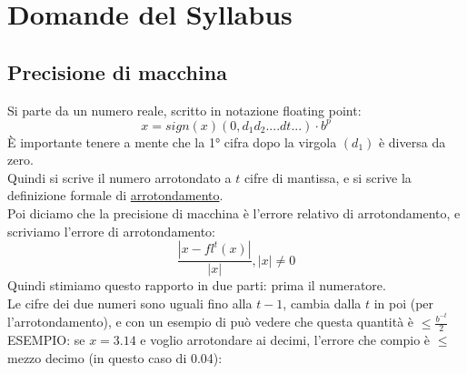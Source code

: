 \section{Domande del Syllabus}

\subsection{Precisione di macchina}
Si parte da un numero reale, scritto in notazione floating point:\\
\begin{displaymath}
    x=sign(x)(0,d_1d_2....dt...)\cdot b^p
\end{displaymath}
È importante tenere a mente che la 1° cifra dopo la virgola $(d_1)$ è diversa da zero.\\
Quindi si scrive il numero arrotondato a $t$ cifre di mantissa, e si scrive la definizione formale di \underline{arrotondamento}.\\
Poi diciamo che la precisione di macchina è l'errore relativo di arrotondamento, e scriviamo l'errore di arrotondamento:
\begin{displaymath}
    \frac{|x-fl^t(x)|}{|x|},  |x| \neq 0
\end{displaymath}
Quindi stimiamo questo rapporto in due parti: prima il numeratore.\\
Le cifre dei due numeri sono uguali fino alla $t-1$, cambia dalla $t$ in poi (per l'arrotondamento), e con un esempio di può vedere che questa quantità è $\leq \frac{b^{-t}}{2}$\\
ESEMPIO: se $x=3.14$ e voglio arrotondare ai decimi, l'errore che compio è $\leq$ mezzo decimo (in questo caso di 0.04):\\
\begin{center}
\end{center}
